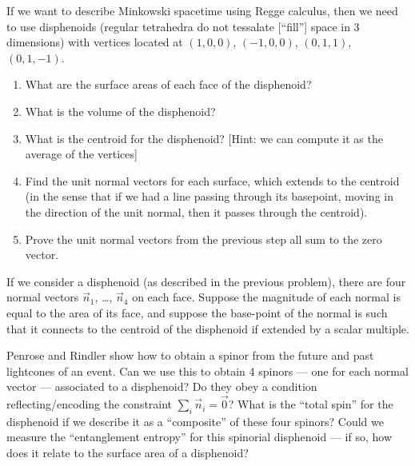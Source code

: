 \begin{exercise}
If we want to describe Minkowski spacetime using Regge calculus,
then we need to use disphenoids (regular tetrahedra do not tessalate
[``fill''] space in 3 dimensions) with vertices located at $(1,0,0)$,
$(-1,0,0)$, $(0,1,1)$, $(0,1,-1)$.

\begin{enumerate}
\item What are the surface areas of each face of the disphenoid?
\item What is the volume of the disphenoid?
\item What is the centroid for the disphenoid? [Hint: we can compute it
  as the average of the vertices]
\item Find the unit normal vectors for each surface, which extends to
  the centroid (in the sense that if we had a line passing through its
  basepoint, moving in the direction of the unit normal, then it passes
  through the centroid).
\item Prove the unit normal vectors from the previous step all sum to
  the zero vector.
\end{enumerate}
\end{exercise}

\begin{exercise}
If we consider a disphenoid (as described in the previous problem),
there are four normal vectors $\vec{n}_{1}$, \dots, $\vec{n}_{4}$ on
each face. Suppose the magnitude of each normal is equal to the area of
its face, and suppose the base-point of the normal is such that it
connects to the centroid of the disphenoid if extended by a scalar
multiple.

Penrose and Rindler show how to obtain a spinor from the future and past
lightcones of an event. Can we use this to obtain 4 spinors --- one for
each normal vector --- associated to a disphenoid? Do they obey a
condition reflecting/encoding the
constraint $\sum_{i}\vec{n}_{i} = \vec{0}$? What is the ``total spin''
for the disphenoid if we describe it as a ``composite'' of these four spinors?
Could we measure the ``entanglement entropy'' for this spinorial
disphenoid --- if so, how does it relate to the surface area of a disphenoid?
\end{exercise}
